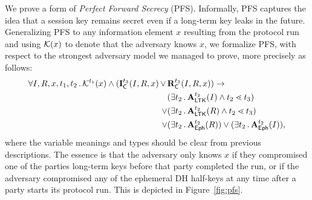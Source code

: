 We prove a form of \emph{Perfect Forward Secrecy} (PFS).
%
Informally, PFS captures the idea that a session key remains secret even if
a long-term key leaks in the future.
%
Generalizing PFS to any information element $x$ resulting from the protocol run
and using $\mathcal{K}(x)$ to denote that the adversary knows $x$, we formalize PFS, with
respect to the strongest adversary model we managed to prove,
more precisely as follows:
%
\begin{align*}
    \forall I, R, x, t_1, t_2\operatorname{.}
    \mathcal{K}^{t_1}(x) \land (\mathbf{I}_{\textsf{C}}^{t_3}(I, R, x)\, \lor\, & \mathbf{R}_{\textsf{C}}^{t_3}(I, R, x))
    \rightarrow\\
    &(\exists t_2\operatorname{.} \mathbf{A}_{\textsf{LTK}}^{t_2}(I) \land t_2 \lessdot t_3)\\
    \lor&(\exists t_2\operatorname{.} \mathbf{A}_{\textsf{LTK}}^{t_2}(R) \land t_2 \lessdot t_3)\\
    \lor&(\exists t_2\operatorname{.} \mathbf{A}_{\textsf{Eph}}^{t_2}(R))
    \lor(\exists t_2\operatorname{.} \mathbf{A}_{\textsf{Eph}}^{t_2}(I)),
\end{align*}
%
where the variable meanings and types should be clear from previous
descriptions.
%
The essence is that the adversary only knows $x$ if they compromised one of the
parties long-term keys before that party completed the run, or if the adversary
compromised any of the ephemeral DH half-keys at any time after a party starts
its protocol run.
%
This is depicted in Figure~\ref{fig:pfs}.
%
